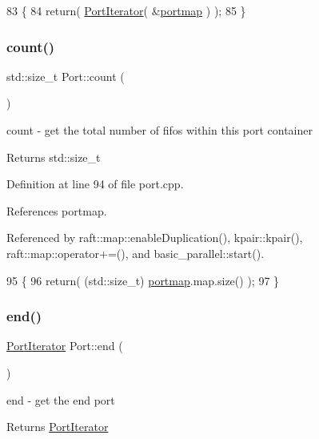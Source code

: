 \begin{DoxyCode}
83 \{
84    \textcolor{keywordflow}{return}( \hyperlink{class_port_iterator}{PortIterator}( &\hyperlink{class_port_a537a8a0c2a47acbf8654f286200aee90}{portmap} ) );
85 \}
\end{DoxyCode}
\hypertarget{class_port_a33562ea87ac7e83a32441da40cbd9279}{}\label{class_port_a33562ea87ac7e83a32441da40cbd9279} 
\subsubsection{\texorpdfstring{count()}{count()}}
{\footnotesize\ttfamily std\+::size\+\_\+t Port\+::count (\begin{DoxyParamCaption}{ }\end{DoxyParamCaption})}

count -\/ get the total number of fifos within this port container \begin{DoxyReturn}{Returns}
std\+::size\+\_\+t 
\end{DoxyReturn}


Definition at line 94 of file port.\+cpp.



References portmap.



Referenced by raft\+::map\+::enable\+Duplication(), kpair\+::kpair(), raft\+::map\+::operator+=(), and basic\+\_\+parallel\+::start().


\begin{DoxyCode}
95 \{
96    \textcolor{keywordflow}{return}( (std::size\_t) \hyperlink{class_port_a537a8a0c2a47acbf8654f286200aee90}{portmap}.map.size() );
97 \}
\end{DoxyCode}
\hypertarget{class_port_aa85be3fb7734863d482bf002e0f0923d}{}\label{class_port_aa85be3fb7734863d482bf002e0f0923d} 
\subsubsection{\texorpdfstring{end()}{end()}}
{\footnotesize\ttfamily \hyperlink{class_port_iterator}{Port\+Iterator} Port\+::end (\begin{DoxyParamCaption}{ }\end{DoxyParamCaption})\hspace{0.3cm}{\ttfamily [virtual]}}

end -\/ get the end port \begin{DoxyReturn}{Returns}
\hyperlink{class_port_iterator}{Port\+Iterator} 
\end{DoxyReturn}


